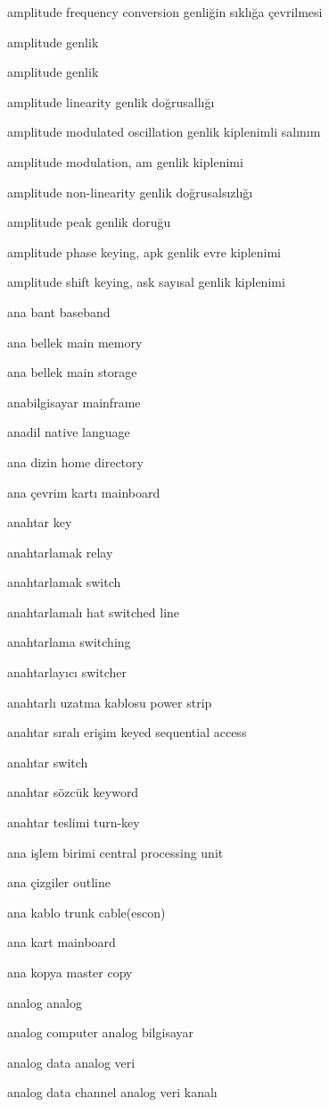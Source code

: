 \documentclass[12pt,fleqn]{article}\usepackage{../../common}
\begin{document}
amplitude frequency conversion genliğin sıklığa çevrilmesi

amplitude genlik

amplitude genlik

amplitude linearity genlik doğrusallığı

amplitude modulated oscillation genlik kiplenimli salınım

amplitude modulation, am genlik kiplenimi

amplitude non-linearity genlik doğrusalsızlığı

amplitude peak genlik doruğu

amplitude phase keying, apk genlik evre kiplenimi

amplitude shift keying, ask sayısal genlik kiplenimi

ana bant baseband

ana bellek main memory

ana bellek main storage

anabilgisayar mainframe

anadil native language

ana dizin home directory

ana çevrim kartı mainboard

anahtar key

anahtarlamak relay

anahtarlamak switch

anahtarlamalı hat switched line

anahtarlama switching

anahtarlayıcı switcher

anahtarlı uzatma kablosu power strip

anahtar sıralı erişim keyed sequential access

anahtar switch

anahtar sözcük keyword

anahtar teslimi turn-key

ana işlem birimi central processing unit

ana çizgiler outline

ana kablo trunk cable(escon)

ana kart mainboard

ana kopya master copy

analog analog

analog computer analog bilgisayar

analog data analog veri

analog data channel analog veri kanalı
\end{document}
